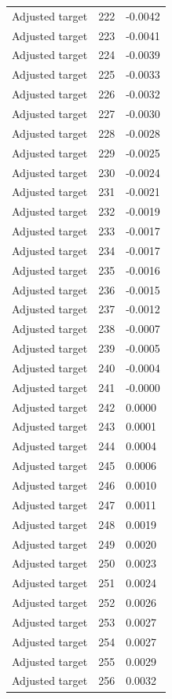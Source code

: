 \begin{table}[htbp]
\begin{tabular}{lll}
Adjusted target & 222 & -0.0042 \\
Adjusted target & 223 & -0.0041 \\
Adjusted target & 224 & -0.0039 \\
Adjusted target & 225 & -0.0033 \\
Adjusted target & 226 & -0.0032 \\
Adjusted target & 227 & -0.0030 \\
Adjusted target & 228 & -0.0028 \\
Adjusted target & 229 & -0.0025 \\
Adjusted target & 230 & -0.0024 \\
Adjusted target & 231 & -0.0021 \\
Adjusted target & 232 & -0.0019 \\
Adjusted target & 233 & -0.0017 \\
Adjusted target & 234 & -0.0017 \\
Adjusted target & 235 & -0.0016 \\
Adjusted target & 236 & -0.0015 \\
Adjusted target & 237 & -0.0012 \\
Adjusted target & 238 & -0.0007 \\
Adjusted target & 239 & -0.0005 \\
Adjusted target & 240 & -0.0004 \\
Adjusted target & 241 & -0.0000 \\
Adjusted target & 242 & 0.0000 \\
Adjusted target & 243 & 0.0001 \\
Adjusted target & 244 & 0.0004 \\
Adjusted target & 245 & 0.0006 \\
Adjusted target & 246 & 0.0010 \\
Adjusted target & 247 & 0.0011 \\
Adjusted target & 248 & 0.0019 \\
Adjusted target & 249 & 0.0020 \\
Adjusted target & 250 & 0.0023 \\
Adjusted target & 251 & 0.0024 \\
Adjusted target & 252 & 0.0026 \\
Adjusted target & 253 & 0.0027 \\
Adjusted target & 254 & 0.0027 \\
Adjusted target & 255 & 0.0029 \\
Adjusted target & 256 & 0.0032 \\

\end{tabular}
\end{table}
